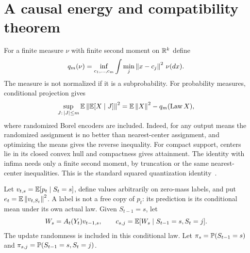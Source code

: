 \section{A causal energy and compatibility theorem}\label{sec:energy}
For a finite measure $\nu$ with finite second moment on $\mathbb R^k$ define
\[
 q_m(\nu)=\inf_{c_1,\ldots,c_m}\int\min_j\left\lVert x-c_j\right\rVert^2\,\nu(dx).
\]
The measure is not normalized if it is a subprobability. For probability measures, conditional projection gives
\begin{equation}\label{eq:q-energy}
 \sup_{J:\,|J|\le m}\mathbb E\left\lVert\mathbb E[X\mid J]\right\rVert^2
 =\mathbb E\left\lVert X\right\rVert^2-q_m(\operatorname{Law}X),
\end{equation}
where randomized Borel encoders are included. Indeed, for any output means the randomized assignment is no better than nearest-center assignment, and optimizing the means gives the reverse inequality. For compact support, centers lie in its closed convex hull and compactness gives attainment. The identity with infima needs only a finite second moment, by truncation or the same nearest-center inequalities. This is the standard squared quantization identity~\cite{GrafLuschgy}.

Let $v_{t,s}=\mathbb E[p_t\mid S_t=s]$, define values arbitrarily on zero-mass labels, and put $e_t=\mathbb E\left\lVert v_{t,S_t}\right\rVert^2$. A label is not a free copy of $p_t$: its prediction is its conditional mean under its own actual law. Given $S_{t-1}=s$, let
\[
 W_s=A_t(Y_t)v_{t-1,s},\qquad
 c_{s,j}=\mathbb E[W_s\mid S_{t-1}=s,S_t=j].
\]
The update randomness is included in this conditional law. Let $\pi_s=\mathbb P(S_{t-1}=s)$ and $\pi_{s,j}=\mathbb P(S_{t-1}=s,S_t=j)$.

